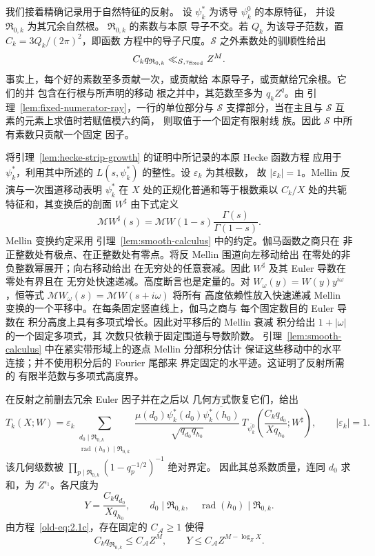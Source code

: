 \documentclass[11pt,a4paper]{article}
\numberwithin{equation}{section}
\numberwithin{figure}{section}
\theoremstyle{definition}
\theoremstyle{remark}
\begin{document}
我们接着精确记录用于自然特征的反射。
设 \(\psi_k^*\) 为诱导 \(\psi_k^0\) 的本原特征，
并设 \(\mathfrak R_{0,k}\) 为其冗余自然根。
\(\mathfrak R_{0,k}\) 的素数与本原
导子不交。若 \(Q_k\) 为该导子范数，置
\(C_k=3Q_k/(2\pi)^2\)，即函数
方程中的导子尺度。\(\mathcal S\) 之外素数处的驯顺性给出
\begin{equation}
 C_kq_{\mathfrak R_{0,k}}
 \ll_{\mathcal S,\tau_{\rm fixed}} Z^M.
 \label{old-eq:2.1c}
\end{equation}
事实上，每个好的素数至多贡献一次，或贡献给
本原导子，或贡献给冗余根。它们的并
包含在行根与所声明的移动
根之并中，其范数至多为 \(q_kZ^q\)。由
引理~\ref{lem:fixed-numerator-ray}，一行的单位部分与
\(\mathcal S\) 支撑部分，当在主且与 \(\mathcal S\) 互素的元素上求值时若赋值模六约简，
则取值于一个固定有限射线
族。因此 \(\mathcal S\) 中所有素数只贡献一个固定
因子。

将引理~\ref{lem:hecke-strip-growth} 的证明中所记录的本原 Hecke 函数方程
应用于 \(\psi_k^*\)，利用其中所述的
\(L(s,\psi_k^*)\) 的整性。设 \(\varepsilon_k\) 为其根数，
故 \(|\varepsilon_k|=1\)。Mellin 反演与一次围道移动表明
\(\psi_k^*\) 在 \(X\) 处的正规化普通和等于根数乘以
\(C_k/X\) 处的共轭
特征和，其变换后的剖面 \(W^\sharp\)
由下式定义
\[
 \mathcal M W^\sharp(s)
 =\mathcal M W(1-s)\frac{\Gamma(s)}{\Gamma(1-s)}.
\]
Mellin 变换约定采用
引理~\ref{lem:smooth-calculus} 中的约定。伽马函数之商只在
非正整数处有极点、在正整数处有零点。将反 Mellin 围道向左移动给出
在零处的非负整数幂展开；向右移动给出
在无穷处的任意衰减。因此 \(W^\sharp\) 及其
Euler 导数在零处有界且在
无穷处快速递减。高度断言也是定量的。对
\(W_\omega(y)=W(y)y^{i\omega}\)，恒等式
\(\mathcal M W_\omega(s)=\mathcal M W(s+i\omega)\) 将所有
高度依赖性放入快速递减 Mellin
变换的一个平移中。在每条固定竖直线上，伽马之商与
每个固定数目的 Euler 导数在
积分高度上具有多项式增长。因此对平移后的 Mellin 衰减
积分给出 \(1+|\omega|\) 的一个固定多项式，其
次数只依赖于固定围道与导数阶数。
引理~\ref{lem:smooth-calculus} 中在紧实带形域上的逐点 Mellin 分部积分估计
保证这些移动中的水平
连接；并不使用积分后的 Fourier 尾部来
界定固定的水平迹。这证明了反射所需的
有限半范数与多项式高度界。

在反射之前删去冗余 Euler 因子并在之后以
几何方式恢复它们，给出
\[
 T_k(X;W)
 =\varepsilon_k
 \sum_{\substack{d_0\mid\mathfrak R_{0,k}\\
                  \operatorname{rad}(h_0)\mid\mathfrak R_{0,k}}}
 \frac{\mu(d_0)\psi_k^*(d_0)\overline{\psi_k^*(h_0)}}
      {\sqrt{q_{d_0}q_{h_0}}}\,
 T_{\overline{\psi_k^0}}
   \left(\frac{C_kq_{d_0}}{Xq_{h_0}};W^\sharp\right),
 \qquad |\varepsilon_k|=1.
\]
该几何级数被
\(\prod_{p\mid\mathfrak R_{0,k}}(1-q_p^{-1/2})^{-1}\) 绝对界定。
因此其总系数质量，连同 \(d_0\)
求和，为 \(Z^{\epsilon_1}\)。各尺度为
\begin{equation}
 Y=\frac{C_kq_{d_0}}{Xq_{h_0}},\qquad
 d_0\mid\mathfrak R_{0,k},\quad
 \operatorname{rad}(h_0)\mid\mathfrak R_{0,k}.
 \label{old-eq:2.1d}
\end{equation}
由方程~\eqref{old-eq:2.1c}，存在固定的 \(C_{\mathcal A}\ge1\)
使得
\[
 C_kq_{\mathfrak R_{0,k}}\le C_{\mathcal A}Z^M,\qquad
 Y\le C_{\mathcal A}Z^{M-\log_ZX}.
\]
\end{document}
